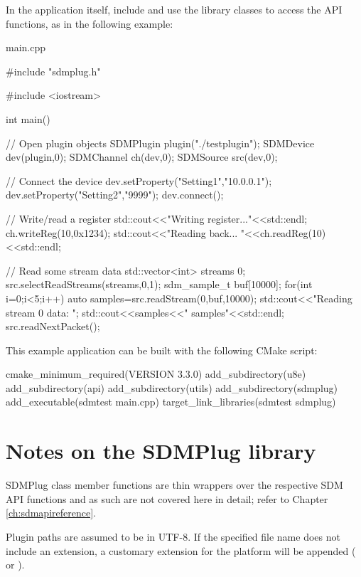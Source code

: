 \documentclass[a4paper,12pt,twoside,extrafontsizes]{memoir}
\begin{document}
In the application itself, include  and use the library classes to access the API functions, as in the following example:

\begin{breakshellcmdsnamed}{main.cpp}\begin{ccode}
#include "sdmplug.h"

#include <iostream>

int main() {
// Open plugin objects
	SDMPlugin plugin("./testplugin");
	SDMDevice dev(plugin,0);
	SDMChannel ch(dev,0);
	SDMSource src(dev,0);
	
// Connect the device
	dev.setProperty("Setting1","10.0.0.1");
	dev.setProperty("Setting2","9999");
	dev.connect();
	
// Write/read a register
	std::cout<<"Writing register..."<<std::endl;
	ch.writeReg(10,0x1234);
	std::cout<<"Reading back... "<<ch.readReg(10)<<std::endl;
	
// Read some stream data
	std::vector<int> streams {0};
	src.selectReadStreams(streams,0,1);
	sdm_sample_t buf[10000];
	for(int i=0;i<5;i++) {
		auto samples=src.readStream(0,buf,10000);
		std::cout<<"Reading stream 0 data: ";
		std::cout<<samples<<" samples"<<std::endl;
		src.readNextPacket();
	}
}
\end{ccode}\end{breakshellcmdsnamed}

This example application can be built with the following CMake script:

\begin{shellcmds}
cmake\_minimum\_required(VERSION 3.3.0)
add\_subdirectory(u8e)
add\_subdirectory(api)
add\_subdirectory(utils)
add\_subdirectory(sdmplug)
add\_executable(sdmtest main.cpp)
target\_link\_libraries(sdmtest sdmplug)
\end{shellcmds}

\section{Notes on the SDMPlug library}

SDMPlug class member functions are thin wrappers over the respective SDM API functions and as such are not covered here in detail; refer to Chapter \ref{ch:sdmapireference}.

Plugin paths are assumed to be in UTF-8. If the specified file name does not include an extension, a customary extension for the platform will be appended ( or ).
\end{document}
